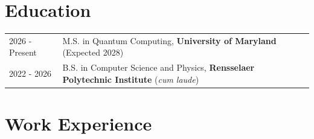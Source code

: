 \documentclass[a4paper,12pt]{article}
\makeatletter
\newenvironment{joblong}[2]
    {
    \begin{tabularx}{\linewidth}{@{}l X r@{}}
    \textbf{#1} & \hfill &  #2 \\[3.75pt]
    \end{tabularx}
    \begin{minipage}[t]{\linewidth}
    \begin{itemize}[nosep,after=\strut, leftmargin=1em, itemsep=3pt,label=--]
    }
    {
    \end{itemize}
    \end{minipage}    
    }
\makeatother
\begin{document}
\section{Education}
\begin{tabularx}{\linewidth}{@{}l X@{}}	
2026 - Present & M.S. in Quantum Computing, \textbf{University of Maryland} (Expected 2028) \\
2022 - 2026    & B.S. in Computer Science and Physics, \textbf{Rensselaer Polytechnic Institute} (\textit{cum laude}) \\
\end{tabularx}

\section{Work Experience}

\end{document}
